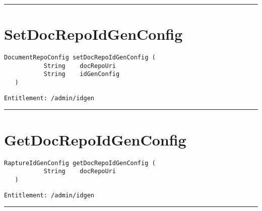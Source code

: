 \rule{12cm}{2pt}
\section{SetDocRepoIdGenConfig}
\label{Api:SetDocRepoIdGenConfig}
\begin{lstlisting}[style=nonumbers]
   DocumentRepoConfig setDocRepoIdGenConfig (
           String    docRepoUri
           String    idGenConfig
   )
\end{lstlisting}
\begin{Verbatim}[formatcom=\color{Maroon}]
  Entitlement: /admin/idgen
\end{Verbatim}



\rule{12cm}{2pt}
\section{GetDocRepoIdGenConfig}
\label{Api:GetDocRepoIdGenConfig}
\begin{lstlisting}[style=nonumbers]
   RaptureIdGenConfig getDocRepoIdGenConfig (
           String    docRepoUri
   )
\end{lstlisting}
\begin{Verbatim}[formatcom=\color{Maroon}]
  Entitlement: /admin/idgen
\end{Verbatim}



\rule{12cm}{2pt}
